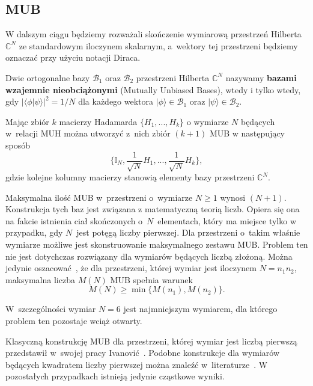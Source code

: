\documentclass[a4paper,12pt,twoside]{article}
\begin{document}

\subsection*{MUB}

W dalszym ci\k{a}gu b\k{e}dziemy rozwa\.{z}ali sko\'{n}czenie wymiarow\k{a} przestrze\'{n} Hilberta $\mathbb{C}^N$ ze standardowym iloczynem skalarnym, a~wektory tej przestrzeni b\k{e}dziemy oznacza\'{c} przy u\.{z}yciu notacji Diraca.

Dwie ortogonalne bazy $\mathcal{B}_1$ oraz $\mathcal{B}_2$ przestrzeni Hilberta $\mathbb{C}^N$ nazywamy \textbf{bazami wzajemnie nieobci\k{a}\.{z}onymi} (Mutually Unbiased Bases), wtedy i tylko wtedy, gdy $|\langle\phi |\psi\rangle|^2=1/N$ dla ka\.{z}dego wektora $|\phi\rangle\in\mathcal{B}_1$ oraz $|\psi\rangle\in\mathcal{B}_2$.

Maj\k{a}c zbi\'{o}r $k$ macierzy Hadamarda $\{H_1,...,H_k\}$ o wymiarze $N$ b\k{e}d\k{a}cych w~relacji MUH mo\.{z}na utworzy\'{c} z~nich zbi\'{o}r $(k+1)$ MUB w nast\k{e}puj\k{a}cy spos\'{o}b
\begin{equation}
\Big\{ \mathbb{I}_N, \frac{1}{\sqrt{N}}H_1, ..., \frac{1}{\sqrt{N}}H_k \Big\},
\end{equation}
gdzie kolejne kolumny macierzy stanowi\k{a} elementy bazy przestrzeni $\mathbb{C}^N$.

Maksymalna ilo\'{s}\'{c} MUB w~przestrzeni o~wymiarze $N \geqslant 1$ wynosi $(N+1)$. Konstrukcja tych baz jest zwi\k{a}zana z matematyczn\k{a} teori\k{a} liczb. Opiera si\k{e} ona na fakcie istnienia cia{\l} sko\'{n}czonych o~$N$~elementach, kt\'{o}ry ma miejsce tylko w przypadku, gdy $N$~jest pot\k{e}g\k{a} liczby pierwszej. Dla przestrzeni o~takim w{\l}a\'{s}nie wymiarze mo\.{z}liwe jest skonstruowanie maksymalnego zestawu MUB. Problem ten nie jest dotychczas rozwi\k{a}zany dla wymiar\'{o}w b\k{e}d\k{a}cych liczb\k{a} z{\l}o\.{z}on\k{a}. Mo\.{z}na jedynie oszacowa\'{c}~\cite{BBRV02}, \.{z}e dla przestrzeni, kt\'{o}rej wymiar jest iloczynem $N=n_1 n_2$, maksymalna liczba $M(N)$ MUB spe{\l}nia warunek
\begin{equation}
M(N) \geqslant \min \big\{M(n_1), M(n_2)\big\}.
\end{equation}

W~szczeg\'{o}lno\'{s}ci wymiar $N=6$ jest najmniejszym wymiarem, dla kt\'{o}rego problem ten pozostaje wci\k{a}\.{z} otwarty.

Klasyczn\k{a} konstrukcj\k{e} MUB dla przestrzeni, kt\'{o}rej wymiar jest liczb\k{a} pierwsz\k{a} przedstawi{\l} w~swojej pracy Ivanovi\'{c}~\cite{Iv81}. Podobne konstrukcje dla wymiar\'{o}w b\k{e}d\k{a}cych kwad\-ra\-tem liczby pierwszej mo\.{z}na znale\'{z}\'{c} w~literaturze~\cite{KR04, WF81}. W pozosta{\l}ych przypadkach istniej\k{a} jedynie cz\k{a}stkowe wyniki.
\end{document}
